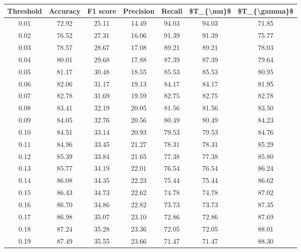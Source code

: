 \begin{tabular}{|c|c|c|c|c|c|c|}
\hline
 Threshold &  Accuracy &  F1 score &  Precision &  Recall &  \$T\_\{\textbackslash mu\}\$ &  \$T\_\{\textbackslash gamma\}\$ \\
\hline
      0.01 &     72.92 &     25.11 &      14.49 &   94.03 &      94.03 &         71.85 \\
      0.02 &     76.52 &     27.31 &      16.06 &   91.39 &      91.39 &         75.77 \\
      0.03 &     78.57 &     28.67 &      17.08 &   89.21 &      89.21 &         78.03 \\
      0.04 &     80.01 &     29.68 &      17.88 &   87.39 &      87.39 &         79.64 \\
      0.05 &     81.17 &     30.48 &      18.55 &   85.53 &      85.53 &         80.95 \\
      0.06 &     82.06 &     31.17 &      19.13 &   84.17 &      84.17 &         81.95 \\
      0.07 &     82.78 &     31.69 &      19.59 &   82.75 &      82.75 &         82.78 \\
      0.08 &     83.41 &     32.19 &      20.05 &   81.56 &      81.56 &         83.50 \\
      0.09 &     84.05 &     32.76 &      20.56 &   80.49 &      80.49 &         84.23 \\
      0.10 &     84.51 &     33.14 &      20.93 &   79.53 &      79.53 &         84.76 \\
      0.11 &     84.96 &     33.45 &      21.27 &   78.31 &      78.31 &         85.29 \\
      0.12 &     85.39 &     33.84 &      21.65 &   77.38 &      77.38 &         85.80 \\
      0.13 &     85.77 &     34.19 &      22.01 &   76.54 &      76.54 &         86.24 \\
      0.14 &     86.08 &     34.35 &      22.23 &   75.44 &      75.44 &         86.62 \\
      0.15 &     86.43 &     34.73 &      22.62 &   74.78 &      74.78 &         87.02 \\
      0.16 &     86.70 &     34.86 &      22.82 &   73.73 &      73.73 &         87.35 \\
      0.17 &     86.98 &     35.07 &      23.10 &   72.86 &      72.86 &         87.69 \\
      0.18 &     87.24 &     35.28 &      23.36 &   72.05 &      72.05 &         88.01 \\
      0.19 &     87.49 &     35.55 &      23.66 &   71.47 &      71.47 &         88.30 \\

\end{tabular}
